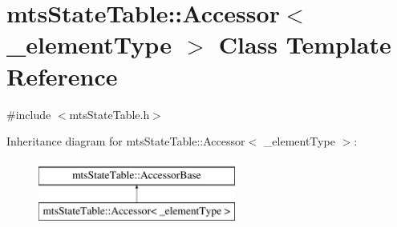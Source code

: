 \hypertarget{classmts_state_table_1_1_accessor}{}\section{mts\+State\+Table\+:\+:Accessor$<$ \+\_\+element\+Type $>$ Class Template Reference}
\label{classmts_state_table_1_1_accessor}


{\ttfamily \#include $<$mts\+State\+Table.\+h$>$}

Inheritance diagram for mts\+State\+Table\+:\+:Accessor$<$ \+\_\+element\+Type $>$\+:\begin{figure}[H]
\begin{center}
\leavevmode
\includegraphics[height=2.000000cm]{d7/d31/classmts_state_table_1_1_accessor}
\end{center}
\end{figure}
